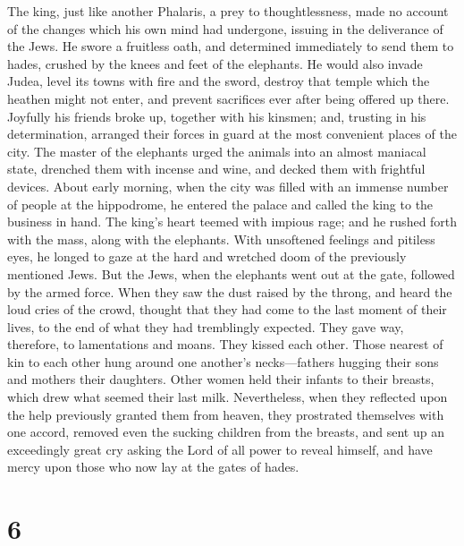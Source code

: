  The king, just like another Phalaris, a prey to
thoughtlessness, made no account of the changes which his own mind had
undergone, issuing in the deliverance of the Jews. He swore a fruitless
oath, and determined immediately to send them to hades, crushed by the
knees and feet of the elephants.  He would also invade
Judea, level its towns with fire and the sword, destroy that temple
which the heathen might not enter, and prevent sacrifices ever after
being offered up there.  Joyfully his friends broke up,
together with his kinsmen; and, trusting in his determination, arranged
their forces in guard at the most convenient places of the city.
 The master of the elephants urged the animals into an
almost maniacal state, drenched them with incense and wine, and decked
them with frightful devices.  About early morning, when the
city was filled with an immense number of people at the hippodrome, he
entered the palace and called the king to the business in hand.
 The king's heart teemed with impious rage; and he rushed
forth with the mass, along with the elephants. With unsoftened feelings
and pitiless eyes, he longed to gaze at the hard and wretched doom of
the previously mentioned Jews.  But the Jews, when the
elephants went out at the gate, followed by the armed force. When they
saw the dust raised by the throng, and heard the loud cries of the
crowd,  thought that they had come to the last moment of
their lives, to the end of what they had tremblingly expected. They gave
way, therefore, to lamentations and moans. They kissed each other. Those
nearest of kin to each other hung around one another's necks---fathers
hugging their sons and mothers their daughters. Other women held their
infants to their breasts, which drew what seemed their last milk.
 Nevertheless, when they reflected upon the help previously
granted them from heaven, they prostrated themselves with one accord,
removed even the sucking children from the breasts, and 
sent up an exceedingly great cry asking the Lord of all power to reveal
himself, and have mercy upon those who now lay at the gates of hades.

\hypertarget{section-5}{%
\section{6}\label{section-5}}

